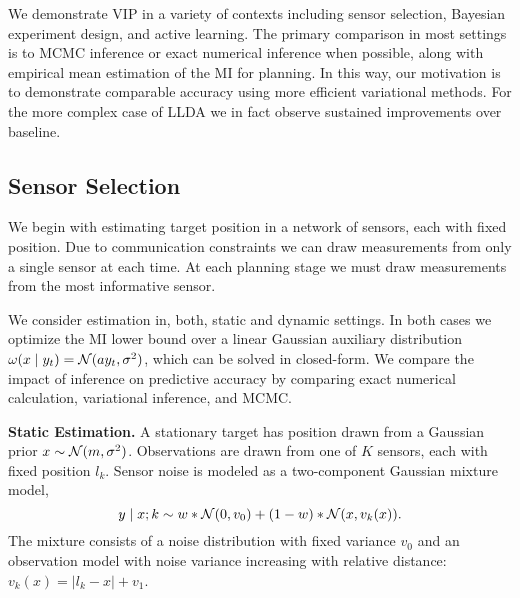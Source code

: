 We demonstrate VIP in a variety of contexts including sensor
selection, Bayesian experiment design, and active learning.  The
primary comparison in most settings is to MCMC inference or exact
numerical inference when possible, along with empirical mean
estimation of the MI for planning.  In this way, our motivation is to
demonstrate comparable accuracy using more efficient variational
methods.  For the more complex case of LLDA we in fact observe
sustained improvements over baseline.

\subsection{Sensor Selection}

We begin with estimating target position in a network of sensors, each
with fixed position.  Due to communication constraints we can draw
measurements from only a single sensor at each time.  At each planning
stage we must draw measurements from the most informative sensor.

We consider estimation in, both, static and dynamic settings.  In both
cases we optimize the MI lower bound over a linear Gaussian auxiliary
distribution $\omega(x \mid y_t) = \mathcal{N}(a y_t, \sigma^2)$, which can be
solved in closed-form.  We compare the impact of inference on
predictive accuracy by comparing exact numerical calculation,
variational inference, and MCMC.



\textbf{Static Estimation.}  A stationary target has position drawn
from a Gaussian prior $x \sim \mathcal{N}(m,\sigma^2)$.  Observations are
drawn from one of $K$ sensors, each with fixed position $l_k$.  Sensor
noise is modeled as a two-component Gaussian mixture model,
\[
  y \mid x; k \sim w * \mathcal{N}(0, v_0) + (1-w) * \mathcal{N}(x, v_k(x)).
\]
The mixture consists of a noise distribution with fixed variance $v_0$
and an observation model with noise variance increasing with relative
distance: \mbox{$v_k(x) = |l_k - x| + v_1$}.

